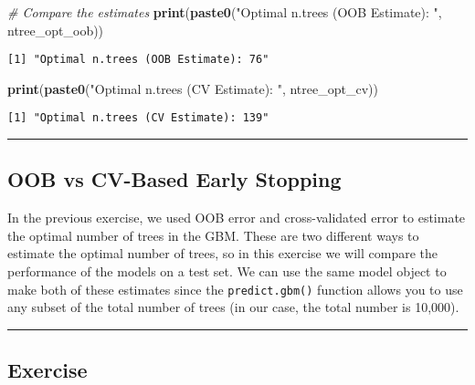 \documentclass[
]{book}
\newenvironment{Shaded}{\begin{snugshade}}{\end{snugshade}}
\newcommand{\CommentTok}[1]{\textcolor[rgb]{0.56,0.35,0.01}{\textit{#1}}}
\newcommand{\KeywordTok}[1]{\textcolor[rgb]{0.13,0.29,0.53}{\textbf{#1}}}
\newcommand{\NormalTok}[1]{#1}
\newcommand{\StringTok}[1]{\textcolor[rgb]{0.31,0.60,0.02}{#1}}
\begin{document}
\begin{Shaded}
\begin{Highlighting}[]
\CommentTok{# Compare the estimates                         }
\KeywordTok{print}\NormalTok{(}\KeywordTok{paste0}\NormalTok{(}\StringTok{"Optimal n.trees (OOB Estimate): "}\NormalTok{, ntree_opt_oob))                         }
\end{Highlighting}
\end{Shaded}

\begin{verbatim}
[1] "Optimal n.trees (OOB Estimate): 76"
\end{verbatim}

\begin{Shaded}
\begin{Highlighting}[]
\KeywordTok{print}\NormalTok{(}\KeywordTok{paste0}\NormalTok{(}\StringTok{"Optimal n.trees (CV Estimate): "}\NormalTok{, ntree_opt_cv))}
\end{Highlighting}
\end{Shaded}

\begin{verbatim}
[1] "Optimal n.trees (CV Estimate): 139"
\end{verbatim}

\begin{center}\rule{0.5\linewidth}{0.5pt}\end{center}

\hypertarget{oob-vs-cv-based-early-stopping}{%
\subsection{OOB vs CV-Based Early Stopping}\label{oob-vs-cv-based-early-stopping}}

In the previous exercise, we used OOB error and cross-validated error to estimate the optimal number of trees in the GBM. These are two different ways to estimate the optimal number of trees, so in this exercise we will compare the performance of the models on a test set. We can use the same model object to make both of these estimates since the \texttt{predict.gbm()} function allows you to use any subset of the total number of trees (in our case, the total number is 10,000).

\begin{center}\rule{0.5\linewidth}{0.5pt}\end{center}

\hypertarget{exercise-26}{%
\subsection*{Exercise}\label{exercise-26}}
\end{document}
